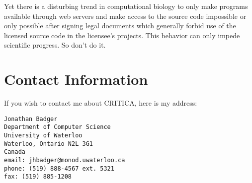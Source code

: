 \documentclass{article}
\begin{document}
Yet there is a disturbing trend in computational biology to only make
programs available through web servers and make access to the source
code impossible or only possible after signing legal documents which
generally forbid use of the licensed source code in the licensee's
projects. This behavior can only impede scientific progress. So don't
do it.


\section{Contact Information}
If you wish to contact me about CRITICA, here is my address:

\begin{verbatim}
Jonathan Badger
Department of Computer Science
University of Waterloo
Waterloo, Ontario N2L 3G1
Canada
email: jhbadger@monod.uwaterloo.ca 
phone: (519) 888-4567 ext. 5321
fax: (519) 885-1208
\end{verbatim}
\end{document}
